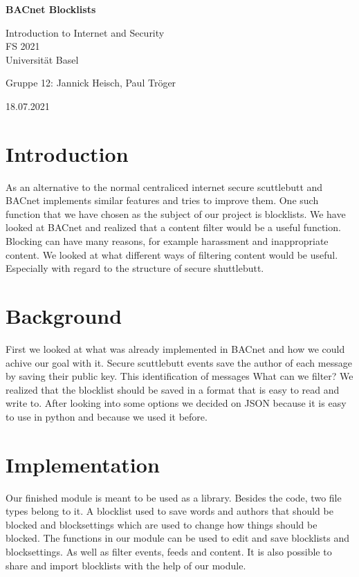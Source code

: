 \documentclass{article}
\begin{document}
\begin{titlepage}
\centering
\vspace*{6cm}
{\huge\bfseries BACnet Blocklists\par}

\vspace{3cm}

{\Large Introduction to Internet and Security}\\
\vspace{0.1cm}
{\Large FS 2021}\\
\vspace{0.1cm}
{\Large Universität Basel}

\vspace{1cm}

{\large Gruppe 12: Jannick Heisch, Paul Tr\"oger}

\vspace{1cm}

{\large 18.07.2021}

\end{titlepage}


\section{Introduction}
As an alternative to the normal centraliced internet secure scuttlebutt and BACnet implements similar features and tries to improve them. 
One such function that we have chosen as the subject of our project is blocklists.
We have looked at BACnet and realized that a content filter would be a useful function.
Blocking can have many reasons, for example harassment and inappropriate content.
We looked at what different ways of filtering content would be useful. 
Especially with regard to the structure of secure shuttlebutt.

\section{Background}
First we looked at what was already implemented in BACnet and how we could achive our goal with it.
Secure scuttlebutt events save the author of each message by saving their public key.
This identification of messages 
What can we filter?
We realized that the blocklist should be saved in a format that is easy to read and write to.
After looking into some options we decided on JSON because it is easy to use in python 
and because we used it before.

\section{Implementation}
Our finished module is meant to be used as a library.
Besides the code, two file types belong to it.
A blocklist used to save words and authors that should be blocked and
blocksettings which are used to change how things should be blocked.
The functions in our module can be used to edit and save blocklists and blocksettings.
As well as filter events, feeds and content.
It is also possible to share and import blocklists with the help of our module. 
\end{document}

